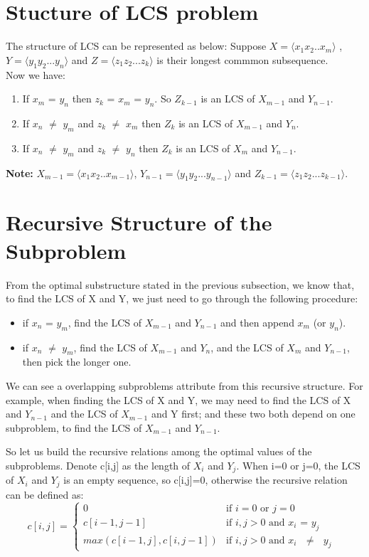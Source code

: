\documentclass{report}
\begin{document}
    \section{Stucture of LCS problem}
    The structure of LCS can be represented as below:
    Suppose $X=\langle x_1x_2..x_m\rangle$ , $Y = \langle y_1y_2...y_n\rangle$ and $Z=\langle z_1 z_2...z_k\rangle$ is their longest commmon subsequence.\\
    Now we have:
    \begin{enumerate}
        \item If $x_m$ = $y_n$ then $z_k$ = $x_m$ = $y_n$. So $Z_{k-1}$ is an LCS of $X_{m-1}$ and $Y_{n-1}$.
        \item If $x_n$ $\neq$ $y_m$ and $z_k$ $\neq$ $x_m$ then $Z_k$ is an LCS of $X_{m-1}$ and $Y_n$.
        \item If $x_n$ $\neq$ $y_m$ and $z_k$ $\neq$ $y_n$ then $Z_k$ is an LCS of $X_{m}$ and $Y_{n-1}$.
    \end{enumerate}
    \textbf{Note:} $X_{m-1}=\langle x_1x_2..x_{m-1}\rangle$, $Y_{n-1} = \langle y_1y_2...y_{n-1}\rangle$ and $Z_{k-1}=\langle z_1 z_2...z_{k-1}\rangle$.
    \newpage
    \section{Recursive Structure of the Subproblem}
    From the optimal substructure stated in the previous subsection, we know that, to find the LCS of X and Y, we just need to go through the following procedure:
    \begin{itemize}
        \item if $x_n$ = $y_m$, find the LCS of $X_{m-1}$ and $Y_{n-1}$ and then append $x_m$ (or $y_n$).
        \item if $x_n$ $\neq$ $y_m$, find the LCS of $X_{m-1}$ and $Y_n$, and the LCS of $X_m$ and $Y_{n-1}$, then pick the longer one.
    \end{itemize}
    
    We can see a overlapping subproblems attribute from this recursive structure. For example, when finding the LCS of X and Y, we may need to find the LCS of X and $Y_{n-1}$ and the LCS of $X_{m-1}$ and Y first; and these two both depend on one subproblem, to find the LCS of $X_{m-1}$ and $Y_{n-1}$.
    
    \bigskip
    So let us build the recursive relations among the optimal values of the subproblems.
    Denote c[i,j] as the length of $X_i$ and $Y_j$. When i=0 or j=0, the LCS of $X_i$ and $Y_j$ is an empty sequence, so c[i,j]=0, otherwise the recursive relation can be defined as:
        \[ c[i,j] =  \begin{cases} 
          0 &  \text{if $i=0$ or $j=0$}   \\
          c[i-1, j-1] & \text{if $i,j > 0$ and $x_i$ = $y_j$ } \\
          max(c[i-1, j], c[i, j-1]) & \text{if $i,j > 0$ and $x_i$  $\neq$ $y_j$ } 
       \end{cases} \]
    
\end{document}
